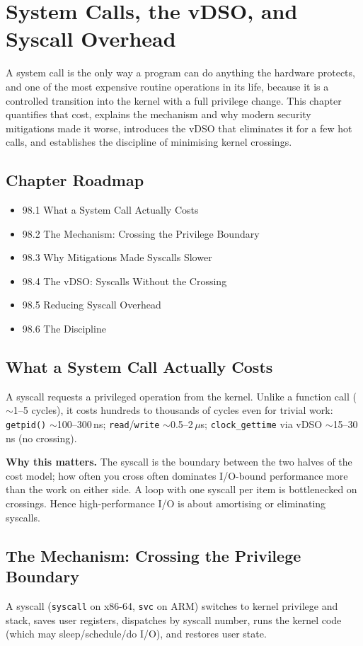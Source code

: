\chapter{System Calls, the vDSO, and Syscall Overhead}

A system call is the only way a program can do anything the hardware protects, and one of the most expensive routine operations in its life, because it is a controlled transition into the kernel with a full privilege change. This chapter quantifies that cost, explains the mechanism and why modern security mitigations made it worse, introduces the vDSO that eliminates it for a few hot calls, and establishes the discipline of minimising kernel crossings.

\section*{Chapter Roadmap}
\begin{itemize}
\item 98.1 What a System Call Actually Costs
\item 98.2 The Mechanism: Crossing the Privilege Boundary
\item 98.3 Why Mitigations Made Syscalls Slower
\item 98.4 The vDSO: Syscalls Without the Crossing
\item 98.5 Reducing Syscall Overhead
\item 98.6 The Discipline
\end{itemize}

\section{What a System Call Actually Costs}
A syscall requests a privileged operation from the kernel. Unlike a function call ($\sim$1--5 cycles), it costs hundreds to thousands of cycles even for trivial work: \texttt{getpid()} $\sim$100--300\,ns; \texttt{read}/\texttt{write} $\sim$0.5--2\,$\mu$s; \texttt{clock\_gettime} via vDSO $\sim$15--30\,ns (no crossing).

\textbf{Why this matters.} The syscall is the boundary between the two halves of the cost model; how often you cross often dominates I/O-bound performance more than the work on either side. A loop with one syscall per item is bottlenecked on crossings. Hence high-performance I/O is about amortising or eliminating syscalls.

\section{The Mechanism: Crossing the Privilege Boundary}
A syscall (\texttt{syscall} on x86-64, \texttt{svc} on ARM) switches to kernel privilege and stack, saves user registers, dispatches by syscall number, runs the kernel code (which may sleep/schedule/do I/O), and restores user state.

